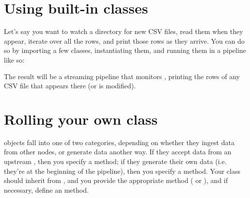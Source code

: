 \documentclass[letterpaper,10pt,english]{sphinxmanual}
\begin{document}
\section{Using built-in  classes}
\label{\detokenize{overview:using-built-in-nanonode-classes}}
Let’s say you want to watch a directory for new CSV files, read them
when they appear, iterate over all the rows, and print those rows as
they arrive. You can do so by importing a few classes, instantiating
them, and running them in a pipeline like so:

%
\begin{sphinxVerbatim}[commandchars=\\\{\}]
  
  
  
  

      

\end{sphinxVerbatim}

The result will be a streaming pipeline that monitors
, printing the rows of any CSV file that appears
there (or is modified).


\section{Rolling your own  class}
\label{\detokenize{overview:rolling-your-own-nanonode-class}}
 objects fall into one of two categories, depending on
whether they ingest data from other nodes, or generate data another way.
If they accept data from an upstream , then you specify a
 method; if they generate their own data (i.e. they’re
at the beginning of the pipeline), then you specify a 
method. Your class should inherit from , and you provide the
appropriate method ( or ), and if
necessary, define an  method.
\end{document}
